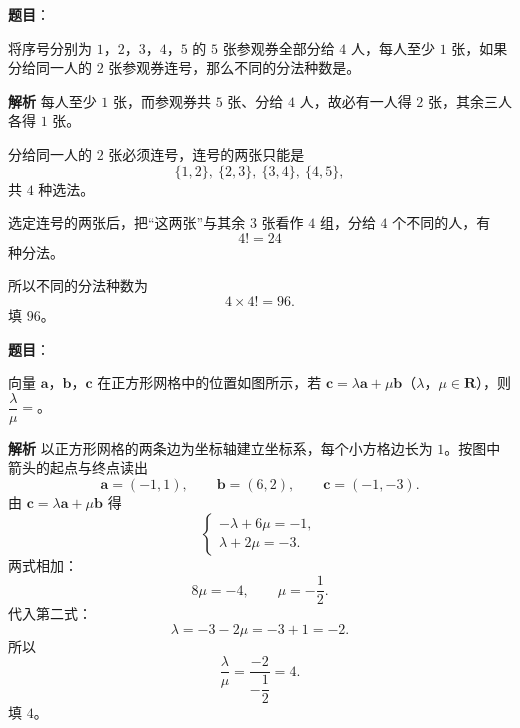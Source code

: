 \begin{answer}

\textbf{题目}：

将序号分别为 $1$，$2$，$3$，$4$，$5$ 的 $5$ 张参观券全部分给 $4$ 人，每人至少 $1$ 张，如果分给同一人的 $2$ 张参观券连号，那么不同的分法种数是\gkblank{}。

\textbf{解析}
每人至少 $1$ 张，而参观券共 $5$ 张、分给 $4$ 人，故必有一人得 $2$ 张，其余三人各得 $1$ 张。

分给同一人的 $2$ 张必须连号，连号的两张只能是
\nopagebreak[4]
\[\{1,2\},\ \{2,3\},\ \{3,4\},\ \{4,5\},\]
共 $4$ 种选法。

选定连号的两张后，把“这两张”与其余 $3$ 张看作 $4$ 组，分给 $4$ 个不同的人，有
\nopagebreak[4]
\[4!=24\]
种分法。

所以不同的分法种数为
\nopagebreak[4]
\[4\times4!=96.\]
填 $96$。


\end{answer}
\begin{answer}

\textbf{题目}：

向量 $\boldsymbol a$，$\boldsymbol b$，$\boldsymbol c$ 在正方形网格中的位置如图所示，若 $\boldsymbol c=\lambda\boldsymbol a+\mu\boldsymbol b$（$\lambda$，$\mu\in\mathbf R$），则 $\dfrac{\lambda}{\mu}=$\gkblank{}。
\nopagebreak[4]
\begin{center}\end{center}
\nopagebreak[4]
\textbf{解析}
以正方形网格的两条边为坐标轴建立坐标系，每个小方格边长为 $1$。按图中箭头的起点与终点读出
\nopagebreak[4]
\[\boldsymbol a=(-1,1),\qquad \boldsymbol b=(6,2),\qquad \boldsymbol c=(-1,-3).\]
由 $\boldsymbol c=\lambda\boldsymbol a+\mu\boldsymbol b$ 得
\nopagebreak[4]
\[\begin{cases}-\lambda+6\mu=-1,\\ \lambda+2\mu=-3.\end{cases}\]
两式相加：
\nopagebreak[4]
\[8\mu=-4,\qquad \mu=-\frac12.\]
代入第二式：
\nopagebreak[4]
\[\lambda=-3-2\mu=-3+1=-2.\]
所以
\nopagebreak[4]
\[\frac{\lambda}{\mu}=\frac{-2}{-\dfrac12}=4.\]
填 $4$。


\end{answer}
